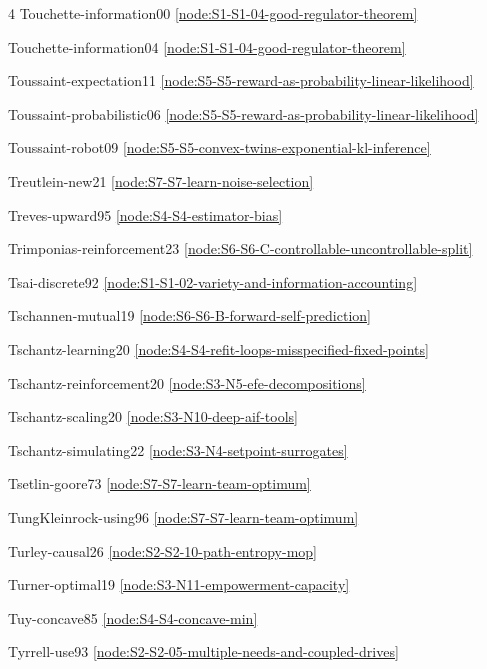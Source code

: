 \documentclass[10pt]{article}
\begin{document}
{\begin{multicols}{4}
Touchette-information00 \hfill \ref{node:S1-S1-04-good-regulator-theorem}\par
Touchette-information04 \hfill \ref{node:S1-S1-04-good-regulator-theorem}\par
Toussaint-expectation11 \hfill \ref{node:S5-S5-reward-as-probability-linear-likelihood}\par
Toussaint-probabilistic06 \hfill \ref{node:S5-S5-reward-as-probability-linear-likelihood}\par
Toussaint-robot09 \hfill \ref{node:S5-S5-convex-twins-exponential-kl-inference}\par
Treutlein-new21 \hfill \ref{node:S7-S7-learn-noise-selection}\par
Treves-upward95 \hfill \ref{node:S4-S4-estimator-bias}\par
Trimponias-reinforcement23 \hfill \ref{node:S6-S6-C-controllable-uncontrollable-split}\par
Tsai-discrete92 \hfill \ref{node:S1-S1-02-variety-and-information-accounting}\par
Tschannen-mutual19 \hfill \ref{node:S6-S6-B-forward-self-prediction}\par
Tschantz-learning20 \hfill \ref{node:S4-S4-refit-loops-misspecified-fixed-points}\par
Tschantz-reinforcement20 \hfill \ref{node:S3-N5-efe-decompositions}\par
Tschantz-scaling20 \hfill \ref{node:S3-N10-deep-aif-tools}\par
Tschantz-simulating22 \hfill \ref{node:S3-N4-setpoint-surrogates}\par
Tsetlin-goore73 \hfill \ref{node:S7-S7-learn-team-optimum}\par
TungKleinrock-using96 \hfill \ref{node:S7-S7-learn-team-optimum}\par
Turley-causal26 \hfill \ref{node:S2-S2-10-path-entropy-mop}\par
Turner-optimal19 \hfill \ref{node:S3-N11-empowerment-capacity}\par
Tuy-concave85 \hfill \ref{node:S4-S4-concave-min}\par
Tyrrell-use93 \hfill \ref{node:S2-S2-05-multiple-needs-and-coupled-drives}\par


\end{multicols}}
\end{document}
